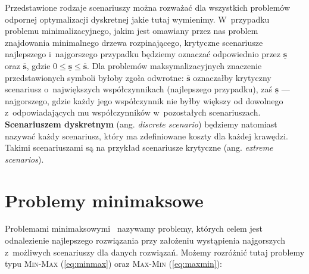 Przedstawione rodzaje scenariuszy można rozważać dla wszystkich problemów odpornej optymalizacji dyskretnej jakie tutaj wymienimy.
W~przypadku problemu minimalizacyjnego, jakim jest omawiany przez nas problem znajdowania minimalnego drzewa rozpinającego, krytyczne scenariusze najlepszego i~najgorszego przypadku będziemy oznaczać odpowiednio przez $\underline{\textbf{s}}$ oraz $\overline{\textbf{s}}$, gdzie $0 \leqslant \underline{\textbf{s}} \leqslant \overline{\textbf{s}}$.
Dla problemów maksymalizacyjnych znaczenie przedstawionych symboli byłoby zgoła odwrotne: $\overline{\textbf{s}}$ oznaczałby krytyczny scenariusz o~największych współczynnikach (najlepszego przypadku), zaś $\underline{\textbf{s}}$ --- najgorszego, gdzie każdy jego współczynnik nie byłby większy od dowolnego z~odpowiadających mu współczynników w~pozostałych scenariuszach.
\textbf{Scenariuszem dyskretnym} (ang. \textit{discrete scenario}) będziemy natomiast nazywać każdy scenariusz, który ma zdefiniowane koszty dla każdej krawędzi.
Takimi scenariuszami są na przykład scenariusze krytyczne (ang. \textit{extreme scenarios}).




\section{Problemy minimaksowe}




Problemami minimaksowymi~\cite[$428$]{minmaxSurvey} nazywamy problemy, których celem jest odnalezienie najlepszego rozwiązania przy założeniu wystąpienia najgorszych z~możliwych scenariuszy dla danych rozwiązań.
Możemy rozróżnić tutaj problemy typu \textsc{Min-Max} (\ref{eq:minmax}) oraz \textsc{Max-Min} (\ref{eq:maxmin}):

